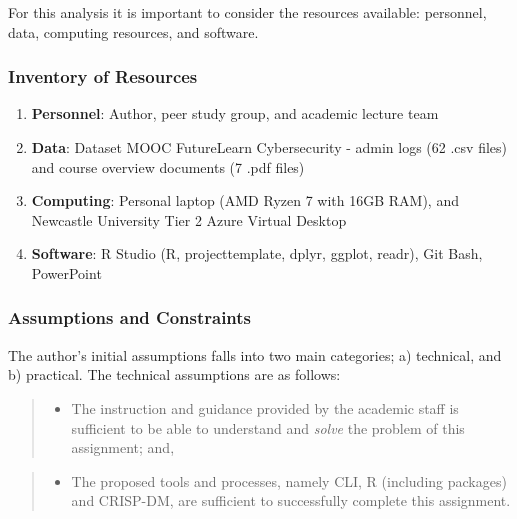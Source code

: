 \documentclass[
]{article}
\providecommand{\tightlist}{%
  \setlength{\itemsep}{0pt}\setlength{\parskip}{0pt}}
\begin{document}
For this analysis it is important to consider the resources available:
personnel, data, computing resources, and software.

\hypertarget{inventory-of-resources}{%
\subsubsection{Inventory of Resources}\label{inventory-of-resources}}

\begin{enumerate}
\def\labelenumi{\arabic{enumi}.}
\tightlist
\item
  \textbf{Personnel}: Author, peer study group, and academic lecture
  team
\item
  \textbf{Data}: Dataset MOOC FutureLearn Cybersecurity - admin logs (62
  .csv files) and course overview documents (7 .pdf files)
\item
  \textbf{Computing}: Personal laptop (AMD Ryzen 7 with 16GB RAM), and
  Newcastle University Tier 2 Azure Virtual Desktop
\item
  \textbf{Software}: R Studio (R, projecttemplate, dplyr, ggplot,
  readr), Git Bash, PowerPoint
\end{enumerate}

\hypertarget{assumptions-and-constraints}{%
\subsubsection{Assumptions and
Constraints}\label{assumptions-and-constraints}}

The author's initial assumptions falls into two main categories; a)
technical, and b) practical. The technical assumptions are as follows:

\begin{quote}
\begin{itemize}
\tightlist
\item
  The instruction and guidance provided by the academic staff is
  sufficient to be able to understand and \emph{solve} the problem of
  this assignment; and,
\end{itemize}
\end{quote}

\begin{quote}
\begin{itemize}
\tightlist
\item
  The proposed tools and processes, namely CLI, R (including packages)
  and CRISP-DM, are sufficient to successfully complete this assignment.
\end{itemize}
\end{quote}
\end{document}
